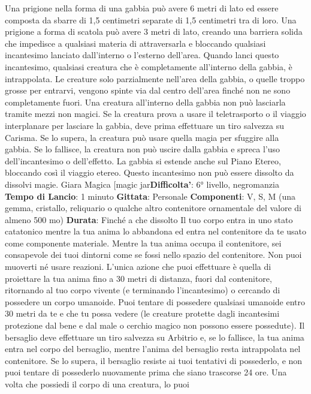 \begin{multicols}{2}
Una prigione nella forma di una gabbia può avere 6
metri di lato ed essere composta da sbarre di 1,5
centimetri separate di 1,5 centimetri tra di loro.
Una prigione a forma di scatola può avere 3 metri di
lato, creando una barriera solida che impedisce a
qualsiasi materia di attraversarla e bloccando qualsiasi
incantesimo lanciato dall’interno o l’esterno dell’area.
Quando lanci questo incantesimo, qualsiasi creatura
che è completamente all’interno della gabbia, è
intrappolata. Le creature solo parzialmente nell’area
della gabbia, o quelle troppo grosse per entrarvi,
vengono spinte via dal centro dell’area finché non ne
sono completamente fuori.
Una creatura all’interno della gabbia non può lasciarla
tramite mezzi non magici. Se la creatura prova a usare
il teletrasporto o il viaggio interplanare per lasciare la
gabbia, deve prima effettuare un tiro salvezza su
Carisma. Se lo supera, la creatura può usare quella
magia per sfuggire alla gabbia. Se lo fallisce, la
creatura non può uscire dalla gabbia e spreca l’uso
dell’incantesimo o dell’effetto. La gabbia si estende
anche sul Piano Etereo, bloccando così il viaggio
etereo.
Questo incantesimo non può essere dissolto da dissolvi
magie.
Giara Magica
[magic jar\textbf{Difficolta'}:
6° livello, negromanzia
\textbf{Tempo di Lancio}: 1 minuto
\textbf{Gittata}: Personale
\textbf{Componenti}: V, S, M (una gemma, cristallo, reliquario
o qualche altro contenitore ornamentale del valore di
almeno 500 mo)
\textbf{Durata}: Finché a che dissolto
Il tuo corpo entra in uno stato catatonico mentre la tua
anima lo abbandona ed entra nel contenitore da te
usato come componente materiale. Mentre la tua anima
occupa il contenitore, sei consapevole dei tuoi dintorni
come se fossi nello spazio del contenitore. Non puoi
muoverti né usare reazioni. L’unica azione che puoi
effettuare è quella di proiettare la tua anima fino a 30
metri di distanza, fuori dal contenitore, ritornando al tuo
corpo vivente (e terminando l’incantesimo) o cercando
di possedere un corpo umanoide.
Puoi tentare di possedere qualsiasi umanoide entro 30
metri da te e che tu possa vedere (le creature protette
dagli incantesimi protezione dal bene e dal male o
cerchio magico non possono essere possedute). Il
bersaglio deve effettuare un tiro salvezza su Arbitrio e,
se lo fallisce, la tua anima entra nel corpo del bersaglio,
mentre l’anima del bersaglio resta intrappolata nel
contenitore. Se lo supera, il bersaglio resiste ai tuoi
tentativi di possederlo, e non puoi tentare di possederlo
nuovamente prima che siano trascorse 24 ore.
Una volta che possiedi il corpo di una creatura, lo puoi

\end{multicols}
